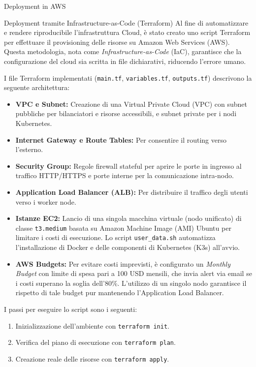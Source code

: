 \begin{mychapter}{Deployment in AWS}

\begin{mysection}{Deployment tramite Infrastructure-as-Code (Terraform)}
Al fine di automatizzare e rendere riproducibile l'infrastruttura Cloud, è stato creato uno script Terraform per effettuare il provisioning delle risorse su Amazon Web Services (AWS).
Questa metodologia, nota come \textit{Infrastructure-as-Code} (IaC), garantisce che la configurazione del cloud sia scritta in file dichiarativi, riducendo l'errore umano.

I file Terraform implementati (\texttt{main.tf}, \texttt{variables.tf}, \texttt{outputs.tf}) descrivono la seguente architettura:
\begin{itemize}
    \item \textbf{VPC e Subnet:} Creazione di una Virtual Private Cloud (VPC) con subnet pubbliche per bilanciatori e risorse accessibili, e subnet private per i nodi Kubernetes.
    \item \textbf{Internet Gateway e Route Tables:} Per consentire il routing verso l'esterno.
    \item \textbf{Security Group:} Regole firewall stateful per aprire le porte in ingresso al traffico HTTP/HTTPS e porte interne per la comunicazione intra-nodo.
    \item \textbf{Application Load Balancer (ALB):} Per distribuire il traffico degli utenti verso i worker node.
    \item \textbf{Istanze EC2:} Lancio di una singola macchina virtuale (nodo unificato) di classe \texttt{t3.medium} basata su Amazon Machine Image (AMI) Ubuntu per limitare i costi di esecuzione. Lo script \texttt{user\_data.sh} automatizza l'installazione di Docker e delle componenti di Kubernetes (K3s) all'avvio.
    \item \textbf{AWS Budgets:} Per evitare costi imprevisti, è configurato un \textit{Monthly Budget} con limite di spesa pari a 100 USD mensili, che invia alert via email se i costi superano la soglia dell'80\%. L'utilizzo di un singolo nodo garantisce il rispetto di tale budget pur mantenendo l'Application Load Balancer.
\end{itemize}

I passi per eseguire lo script sono i seguenti:
\begin{enumerate}
    \item Inizializzazione dell'ambiente con \texttt{terraform init}.
    \item Verifica del piano di esecuzione con \texttt{terraform plan}.
    \item Creazione reale delle risorse con \texttt{terraform apply}.
\end{enumerate}


\end{mysection}
\end{mychapter}
